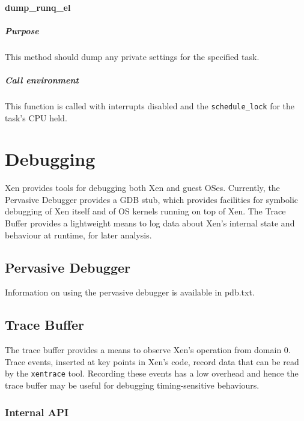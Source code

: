 \documentclass[11pt,twoside,final,openright]{xenstyle}
\begin{document}
\subsubsection{dump\_runq\_el}

\paragraph*{Purpose}

This method should dump any private settings for the specified task.

\paragraph*{Call environment}

This function is called with interrupts disabled and the {\tt schedule\_lock}
for the task's CPU held.


\chapter{Debugging}

Xen provides tools for debugging both Xen and guest OSes.  Currently, the
Pervasive Debugger provides a GDB stub, which provides facilities for symbolic
debugging of Xen itself and of OS kernels running on top of Xen.  The Trace
Buffer provides a lightweight means to log data about Xen's internal state and
behaviour at runtime, for later analysis.

\section{Pervasive Debugger}

Information on using the pervasive debugger is available in pdb.txt.


\section{Trace Buffer}

The trace buffer provides a means to observe Xen's operation from domain 0.
Trace events, inserted at key points in Xen's code, record data that can be
read by the {\tt xentrace} tool.  Recording these events has a low overhead
and hence the trace buffer may be useful for debugging timing-sensitive
behaviours.

\subsection{Internal API}
\end{document}
